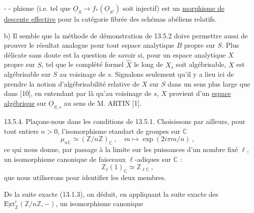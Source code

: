 -  - 
phisme (i.e. tel que $\underline O_S\longrightarrow f_*(\underline O_{S'})$ soit injectif) est un \uline{morphisme de descente effective} pour la catégorie fibrée des schémas abéliens relatifs.

b) Il semble que la méthode de démonstration de 13.5.2 doive permettre aussi de prouver le résultat analogue pour tout espace analytique $B$ propre sur $S$. Plus délicate sans doute est la question de savoir si, pour un espace analytique $X$ propre sur $S$, tel que le complété formel $\widehat X$ le long de $X_s$ soit algébrisable, $X$ est algébrisable sur $S$ au voisinage de $s$. Signalons seulement qu'il y a lieu ici de prendre la notion d'algébrisabilité relative de $X$ sur $S$ dans un sens plus large que dans [10], en entendant par là qu'au voisinage de $s$, $X$ provient d'un \uline{espace algébrique} sur $\underline O_{S,s}$ au sens de M. ARTIN [1].

13.5.4. Plaçons-nous dans les conditions de 13.5.1. Choisissons par ailleurs, pour tout entiers $n>0$, l'isomorphisme standart de groupes sur $\mathbb C$
\[
\mu_{n\mathbb C}\simeq(\mathbb Z/n\mathbb Z)_{\mathbb C}\ ,\quad m\longmapsto\exp(2i\pi m/n)\ ,
\]
ce qui nous donne, par passage à la limite sur les puissances d'un nombre fixé $\ell$, un isomorphisme canonique de faisceaux $\ell$-adiques sur $\mathbb C$ :
\[
\mathbb Z_\ell(1)_{\mathbb C}\simeq\mathbb Z_{\ell\mathbb C}\ ,
\]
que nous utiliserons pour identifier les deux membres.

De la suite exacte (13.1.3), on déduit, en appliquant la suite exacte des $\underline{\mathrm{Ext}}_{\mathbb Z}^i(\mathbb Z/n\mathbb Z,-)$, un isomorphisme canonique
